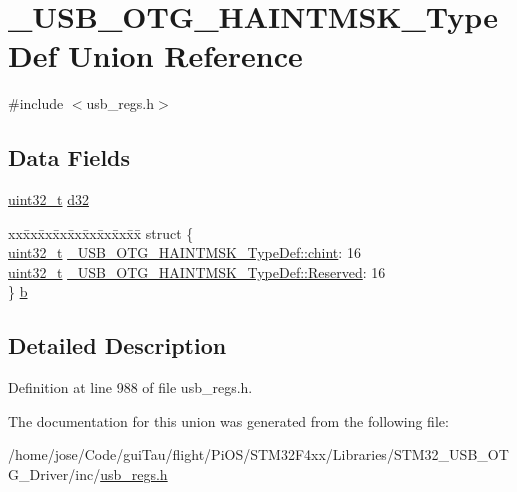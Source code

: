 \hypertarget{union___u_s_b___o_t_g___h_a_i_n_t_m_s_k___type_def}{\section{\-\_\-\-U\-S\-B\-\_\-\-O\-T\-G\-\_\-\-H\-A\-I\-N\-T\-M\-S\-K\-\_\-\-Type\-Def Union Reference}
\label{union___u_s_b___o_t_g___h_a_i_n_t_m_s_k___type_def}
}


{\ttfamily \#include $<$usb\-\_\-regs.\-h$>$}

\subsection*{Data Fields}
\begin{DoxyCompactItemize}
\item 
\hyperlink{stdint_8h_a435d1572bf3f880d55459d9805097f62}{uint32\-\_\-t} \hyperlink{group___u_s_b___o_t_g___d_r_i_v_e_r_ga8c38bda0e50eba179a611f7e1f6458d9}{d32}
\item 
\begin{tabbing}
xx\=xx\=xx\=xx\=xx\=xx\=xx\=xx\=xx\=\kill
struct \{\\
\>\hyperlink{stdint_8h_a435d1572bf3f880d55459d9805097f62}{uint32\_t} \hyperlink{group___u_s_b___o_t_g___d_r_i_v_e_r_ga156b3c134342527fb279cc80d1a79276}{\_USB\_OTG\_HAINTMSK\_TypeDef::chint}: 16\\
\>\hyperlink{stdint_8h_a435d1572bf3f880d55459d9805097f62}{uint32\_t} \hyperlink{group___u_s_b___o_t_g___d_r_i_v_e_r_ga0b3bf390ca5997788021a23ac28ec682}{\_USB\_OTG\_HAINTMSK\_TypeDef::Reserved}: 16\\
\} \hyperlink{group___u_s_b___o_t_g___d_r_i_v_e_r_ga25171c349b89691388dcc922cdfaa435}{b}\\

\end{tabbing}\end{DoxyCompactItemize}


\subsection{Detailed Description}


Definition at line 988 of file usb\-\_\-regs.\-h.



The documentation for this union was generated from the following file\-:\begin{DoxyCompactItemize}
\item 
/home/jose/\-Code/gui\-Tau/flight/\-Pi\-O\-S/\-S\-T\-M32\-F4xx/\-Libraries/\-S\-T\-M32\-\_\-\-U\-S\-B\-\_\-\-O\-T\-G\-\_\-\-Driver/inc/\hyperlink{_s_t_m32_f4xx_2_libraries_2_s_t_m32___u_s_b___o_t_g___driver_2inc_2usb__regs_8h}{usb\-\_\-regs.\-h}\end{DoxyCompactItemize}

